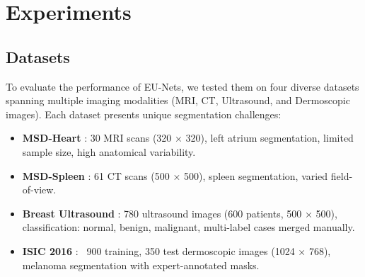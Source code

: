 \documentclass[runningheads]{llncs}
\begin{document}
\section{Experiments}

\subsection{Datasets}
\label{sec:Datasets}
To evaluate the performance of EU-Nets, we tested them on four diverse datasets spanning multiple imaging modalities (MRI, CT, Ultrasound, and Dermoscopic images). Each dataset presents unique segmentation challenges:

\begin{itemize}
    \item \textbf{MSD-Heart} \cite{antonelli2022medical}: 30 MRI scans (320 × 320), left atrium segmentation, limited sample size, high anatomical variability.
    \item \textbf{MSD-Spleen} \cite{antonelli2022medical}: 61 CT scans (500 × 500), spleen segmentation, varied field-of-view.
    \item \textbf{Breast Ultrasound} \cite{al2020dataset}: 780 ultrasound images (600 patients, 500 × 500), classification: normal, benign, malignant, multi-label cases merged manually.
    \item \textbf{ISIC 2016} \cite{codella2018skin}: ~900 training, 350 test dermoscopic images (1024 × 768), melanoma segmentation with expert-annotated masks.
\end{itemize}
\end{document}
